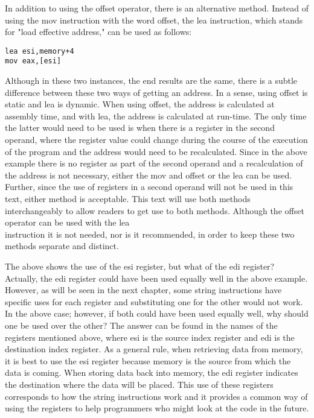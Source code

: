 \documentclass[10pt]{article}
\begin{document}
In addition to using the offset operator, there is an alternative method. Instead of using the mov instruction with the word offset, the lea instruction, which stands for "load effective address," can be used as follows:

\begin{verbatim}
lea esi,memory+4
mov eax,[esi]
\end{verbatim}

Although in these two instances, the end results are the same, there is a subtle difference between these two ways of getting an address. In a sense, using offset is static and lea is dynamic. When using offset, the address is calculated at assembly time, and with lea, the address is calculated at run-time. The only time the latter would need to be used is when there is a register in the second operand, where the register value could change during the course of the execution of the program and the address would need to be recalculated. Since in the above example there is no register as part of the second operand and a recalculation of the address is not necessary, either the mov and offset or the lea can be used. Further, since the use of registers in a second operand will not be used in this text, either method is acceptable. This text will use both methods interchangeably to allow readers to get use to both methods. Although the offset operator can be used with the lea\\
instruction it is not needed, nor is it recommended, in order to keep these two methods separate and distinct.

The above shows the use of the esi register, but what of the edi register? Actually, the edi register could have been used equally well in the above example. However, as will be seen in the next chapter, some string instructions have specific uses for each register and substituting one for the other would not work. In the above case; however, if both could have been used equally well, why should one be used over the other? The answer can be found in the names of the registers mentioned above, where esi is the source index register and edi is the destination index register. As a general rule, when retrieving data from memory, it is best to use the esi register because memory is the source from which the data is coming. When storing data back into memory, the edi register indicates the destination where the data will be placed. This use of these registers corresponds to how the string instructions work and it provides a common way of using the registers to help programmers who might look at the code in the future.
\end{document}
